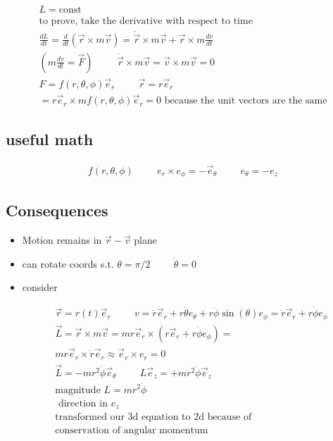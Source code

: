 \documentclass[fleqn]{report}
\newcommand{\hp}{\hspace{1cm}}
\newcommand{\equations} [1] {
\begin{gather*}
#1
\end{gather*}
}
\begin{document}
\equations{
    L = \textrm{const}
    \\
    \textrm{to prove, take the derivative with respect to time}
    \\
    \frac{dL}{dt} = \frac{d}{dt} \left( \vec r \times m \vec v \right)
    =
    \dot \vec r \times m \vec v + \vec r \times m \frac{dv}{dt}
    \\
    \left( m \frac{dv}{dt} = \vec F \right)
    \hp \dot \vec r \times m \vec v = \vec v \times m \vec v = 0
    \\
    F = f(r, \theta, \phi) \vec e_r \hp \vec r = r \vec e_r
    \\
    =
    r \vec e_r \times m f(r, \theta, \phi) \vec e_r = 0
    \textrm{ because the unit vectors are the same}
}

\subsection{useful math}
\equations{
    f(r, \theta, \phi) \hp 
    e_r \times e_\phi = - \vec e_\theta 
    \hp
    e_\theta = - e_z
}


\subsection{Consequences}
\begin{itemize}
    \item
Motion remains in $\vec r - \vec v$ plane 
\item
can rotate coords s.t. $\theta = \pi/2 \hp \dot \theta = 0$
\item 
consider 
\equations{
    \vec r = r(t) \vec e_r \hp v = 
    \dot r \vec e_r + 
    r \dot \theta e_\theta + 
    r \dot \phi \sin(\theta) e_\phi
    =
    \dot r \vec e_r + 
    r \dot \phi e_\phi
    \\
    \vec L = \vec r \times m \vec v = m r \vec e_r \times 
    ( \dot r \vec e_r + r \dot \phi e_\phi) =
    \\
    mr \vec e_r \times \dot r \vec e_r \approx \vec e_r \times e_r = 0
    \\
    \vec L = - mr^2 \dot \phi \vec e_\theta
    \hp
    L \vec e_z = + mr^2 \dot \phi \vec e_z
    \\
    \textrm{magnitude } L = m r^2 \dot \phi 
    \\
    \textrm{ direction in $e_z$} 
    \\
    \textrm{transformed our 3d equation to 2d because of }
    \\
    \textrm{conservation of angular momentum}
}
\end{itemize}
\end{document}
